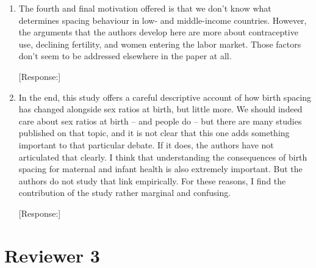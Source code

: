 \documentclass[letterpaper,12pt]{article}
\begin{document}
\begin{enumerate}
[Response:]


\item The fourth and final motivation offered is that we don’t know what
determines spacing behaviour in low- and middle-income countries.
However, the arguments that the authors develop here are more about 
contraceptive use, declining fertility, and women entering the labor market. 
Those factors don’t seem to be addressed elsewhere in the paper at all.

[Response:]


\item In the end, this study offers a careful descriptive account of how birth
spacing has changed alongside sex ratios at birth, but little more. We
should indeed care about sex ratios at birth – and people do – but there
are many studies published on that topic, and it is not clear that this
one adds something important to that particular debate. If it does, the
authors have not articulated that clearly. I think that understanding
the consequences of birth spacing for maternal and infant health is also
extremely important. But the authors do not study that link empirically.
For these reasons, I find the contribution of the study rather marginal
and confusing.

[Response:]


\end{enumerate}

\newpage

\section*{Reviewer 3}
\end{document}
